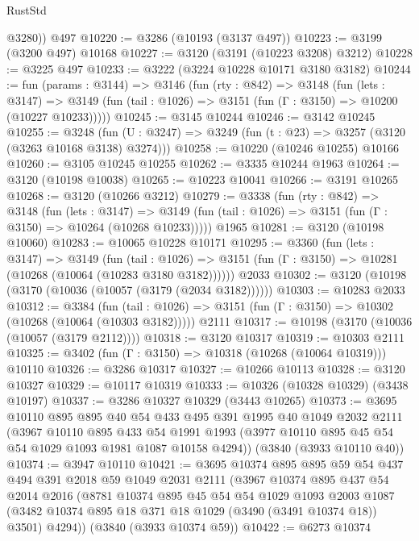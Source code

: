 \begin{lexlean}{RustStd}
\begin{coremodule}
{\begin{coremodule}
{{{{{{{{{{{{{{{{{{{{{{{{{{        @3280))
    @497
@10220 := @3286 (@10193 (@3137 @497))
@10223 := @3199 (@3200 @497) @10168
@10227 := @3120 (@3191 (@10223 @3208) @3212)
@10228 := @3225 @497
@10233 := @3222 (@3224 @10228 @10171 @3180 @3182)
@10244 := fun (params : @3144) =>
  @3146
    (fun (rty : @842) =>
    @3148
      (fun (lets : @3147) =>
      @3149 (fun (tail : @1026) => @3151 (fun (Γ : @3150) => @10200 (@10227 @10233)))))
@10245 := @3145 @10244
@10246 := @3142 @10245
@10255 := @3248
    (fun (U : @3247) => @3249 (fun (t : @23) => @3257 (@3120 (@3263 @10168 @3138) @3274)))
@10258 := @10220 (@10246 @10255) @10166
@10260 := @3105 @10245 @10255
@10262 := @3335 @10244 @1963
@10264 := @3120 (@10198 @10038)
@10265 := @10223 @10041
@10266 := @3191 @10265
@10268 := @3120 (@10266 @3212)
@10279 := @3338
    (fun (rty : @842) =>
    @3148
      (fun (lets : @3147) =>
      @3149 (fun (tail : @1026) => @3151 (fun (Γ : @3150) => @10264 (@10268 @10233)))))
    @1965
@10281 := @3120 (@10198 @10060)
@10283 := @10065 @10228 @10171
@10295 := @3360
    (fun (lets : @3147) =>
    @3149
      (fun (tail : @1026) =>
      @3151 (fun (Γ : @3150) => @10281 (@10268 (@10064 (@10283 @3180 @3182))))))
    @2033
@10302 := @3120 (@10198 (@3170 (@10036 (@10057 (@3179 (@2034 @3182))))))
@10303 := @10283 @2033
@10312 := @3384
    (fun (tail : @1026) => @3151 (fun (Γ : @3150) => @10302 (@10268 (@10064 (@10303 @3182)))))
    @2111
@10317 := @10198 (@3170 (@10036 (@10057 (@3179 @2112))))
@10318 := @3120 @10317
@10319 := @10303 @2111
@10325 := @3402 (fun (Γ : @3150) => @10318 (@10268 (@10064 @10319))) @10110
@10326 := @3286 @10317
@10327 := @10266 @10113
@10328 := @3120 @10327
@10329 := @10117 @10319
@10333 := @10326 (@10328 @10329) (@3438 @10197)
@10337 := @3286 @10327 @10329 (@3443 @10265)
@10373 := @3695
    @10110
    @895
    @895
    @40
    @54
    @433
    @495
    @391
    @1995
    @40
    @1049
    @2032
    @2111
    (@3967
      @10110
      @895
      @433
      @54
      @1991
      @1993
      (@3977 @10110 @895 @45 @54 @54 @1029 @1093 @1981 @1087 @10158 @4294))
    (@3840 (@3933 @10110 @40))
@10374 := @3947 @10110
@10421 := @3695
    @10374
    @895
    @895
    @59
    @54
    @437
    @494
    @391
    @2018
    @59
    @1049
    @2031
    @2111
    (@3967
      @10374
      @895
      @437
      @54
      @2014
      @2016
      (@8781
        @10374
        @895
        @45
        @54
        @54
        @1029
        @1093
        @2003
        @1087
        (@3482 @10374 @895 @18 @371 @18 @1029 (@3490 (@3491 @10374 @18)) @3501)
        @4294))
    (@3840 (@3933 @10374 @59))
@10422 := @6273 @10374
}}}}}}}}}}}}}}}}}}}}}}}}}}
\end{coremodule}}
\end{coremodule}
\end{lexlean}
